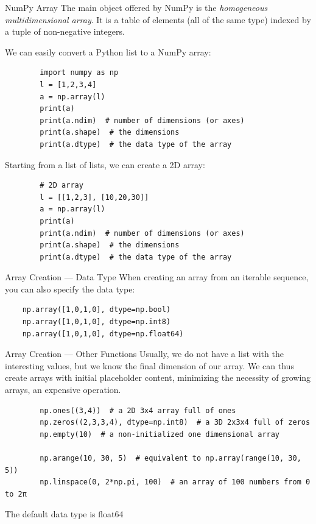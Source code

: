 \documentclass[aspectratio=169,]{beamer}
\begin{document}
\begin{frame}{NumPy Array}
    The main object offered by NumPy is the \emph{homogeneous multidimensional array}.
    It is a table of elements (all of the same type) indexed by a tuple of non-negative integers.

    We can easily convert a Python list to a NumPy array:
    \begin{verbatim}
        import numpy as np
        l = [1,2,3,4]
        a = np.array(l)
        print(a)
        print(a.ndim)  # number of dimensions (or axes)
        print(a.shape)  # the dimensions
        print(a.dtype)  # the data type of the array
    \end{verbatim}
    \framebreak

    Starting from a list of lists, we can create a 2D array:
    \begin{verbatim}
        # 2D array
        l = [[1,2,3], [10,20,30]]
        a = np.array(l)
        print(a)
        print(a.ndim)  # number of dimensions (or axes)
        print(a.shape)  # the dimensions
        print(a.dtype)  # the data type of the array
    \end{verbatim}
\end{frame}

\begin{frame}[fragile]{Array Creation --- Data Type}
    When creating an array from an iterable sequence, you can also specify the data type:
    \begin{verbatim}
    np.array([1,0,1,0], dtype=np.bool)
    np.array([1,0,1,0], dtype=np.int8)
    np.array([1,0,1,0], dtype=np.float64)
    \end{verbatim}
\end{frame}

\begin{frame}[fragile]{Array Creation --- Other Functions}
    Usually, we do not have a list with the interesting values, but we know the final dimension of our array. We can
    thus create arrays with initial placeholder content, minimizing the necessity of growing arrays, an expensive
    operation.
    \begin{verbatim}
        np.ones((3,4))  # a 2D 3x4 array full of ones
        np.zeros((2,3,3,4), dtype=np.int8)  # a 3D 2x3x4 full of zeros
        np.empty(10)  # a non-initialized one dimensional array

        np.arange(10, 30, 5)  # equivalent to np.array(range(10, 30, 5))
        np.linspace(0, 2*np.pi, 100)  # an array of 100 numbers from 0 to 2π
    \end{verbatim}

    The default data type is float64
\end{frame}
\end{document}
